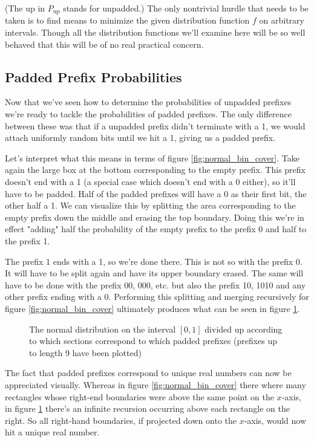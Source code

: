 (The up in $P_{\text{up}}$ stands for unpadded.) The only nontrivial hurdle that needs to be taken is to find means to minimize the given distribution function $f$ on arbitrary intervals. Though all the distribution functions we'll examine here will be so well behaved that this will be of no real practical concern.

\subsection{Padded Prefix Probabilities}

Now that we've seen how to determine the probabilities of unpadded prefixes we're ready to tackle the probabilities of padded prefixes. The only difference between these was that if a unpadded prefix didn't terminate with a 1, we would attach uniformly random bits until we hit a 1, giving us a padded prefix.

Let's interpret what this means in terms of figure \ref{fig:normal_bin_cover}. Take again the large box at the bottom corresponding to the empty prefix. This prefix doesn't end with a 1 (a special case which doesn't end with a 0 either), so it'll have to be padded. Half of the padded prefixes will have a 0 as their first bit, the other half a 1. We can visualize this by splitting the area corresponding to the empty prefix down the middle and erasing the top boundary. Doing this we're in effect "adding" half the probability of the empty prefix to the prefix 0 and half to the prefix 1.

The prefix 1 ends with a 1, so we're done there. This is not so with the prefix 0. It will have to be split again and have its upper boundary erased. The same will have to be done with the prefix 00, 000, etc. but also the prefix 10, 1010 and any other prefix ending with a 0. Performing this splitting and merging recursively for figure \ref{fig:normal_bin_cover} ultimately produces what can be seen in figure \ref{fig:normal_bin_cover_padded}.

\begin{figure}[h]
    \centering
    
    \caption{The normal distribution on the interval $[0,1]$ divided up according to which sections correspond to which padded prefixes (prefixes up to length 9 have been plotted)}
    \label{fig:normal_bin_cover_padded}
\end{figure}

The fact that padded prefixes correspond to unique real numbers can now be appreciated visually. Whereas in figure \ref{fig:normal_bin_cover} there where many rectangles whose right-end boundaries were above the same point on the $x$-axis, in figure \ref{fig:normal_bin_cover_padded} there's an infinite recursion occurring above each rectangle on the right. So all right-hand boundaries, if projected down onto the $x$-axis, would now hit a unique real number.

